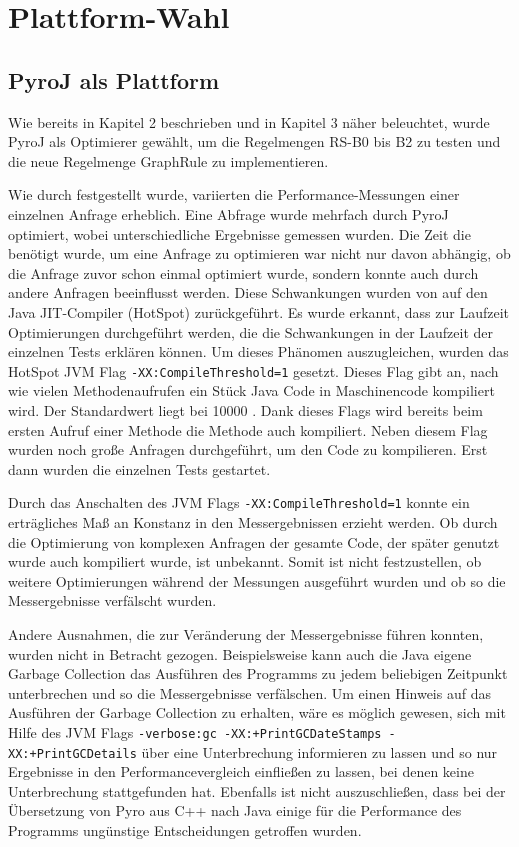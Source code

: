 \section{Plattform-Wahl}

\subsection{PyroJ als Plattform}

Wie bereits in Kapitel 2 beschrieben und in Kapitel 3 näher beleuchtet, wurde PyroJ als Optimierer gewählt, um die Regelmengen RS-B0 bis B2 zu testen und die neue Regelmenge GraphRule zu implementieren.

Wie durch \cite{shanbhag2014optimizing} festgestellt wurde, variierten die Performance-Messungen einer einzelnen Anfrage erheblich. Eine Abfrage wurde mehrfach durch PyroJ optimiert, wobei unterschiedliche Ergebnisse gemessen wurden. Die Zeit die benötigt wurde, um eine Anfrage zu optimieren war nicht nur davon abhängig, ob die Anfrage zuvor schon einmal optimiert wurde, sondern konnte auch durch andere Anfragen beeinflusst werden. Diese Schwankungen wurden von \cite{shanbhag2014optimizing} auf den Java JIT-Compiler (HotSpot) zurückgeführt. Es wurde erkannt, dass zur Laufzeit Optimierungen durchgeführt werden, die die Schwankungen in der Laufzeit der einzelnen Tests erklären können. Um dieses Phänomen auszugleichen, wurden das HotSpot JVM Flag \texttt{-XX:CompileThreshold=1} gesetzt. Dieses Flag gibt an, nach wie vielen Methodenaufrufen ein Stück Java Code in Maschinencode kompiliert wird. Der Standardwert liegt bei 10000 \cite{oracle2015VMOptions}. Dank dieses Flags wird bereits beim ersten Aufruf einer Methode die Methode auch kompiliert. Neben diesem Flag wurden noch große Anfragen durchgeführt, um den Code zu kompilieren. Erst dann wurden die einzelnen Tests gestartet.


Durch das Anschalten des JVM Flags \texttt{-XX:CompileThreshold=1} konnte ein erträgliches Maß an Konstanz in den Messergebnissen erzieht werden. Ob durch die Optimierung von komplexen Anfragen der gesamte Code, der später genutzt wurde auch kompiliert wurde, ist unbekannt. Somit ist nicht festzustellen, ob weitere Optimierungen während der Messungen ausgeführt wurden und ob so die Messergebnisse verfälscht wurden.

Andere Ausnahmen, die zur Veränderung der Messergebnisse führen konnten, wurden nicht in Betracht gezogen. Beispielsweise kann auch die Java eigene  Garbage Collection das Ausführen des Programms zu jedem beliebigen Zeitpunkt unterbrechen und so die Messergebnisse verfälschen. Um einen Hinweis auf das Ausführen der Garbage Collection zu erhalten, wäre es möglich gewesen, sich mit Hilfe des  JVM Flags \texttt{-verbose:gc -XX:+PrintGCDateStamps -XX:+PrintGCDetails} über eine Unterbrechung informieren zu lassen  \cite{andreasson2015JVM}  und so nur Ergebnisse in den Performancevergleich einfließen zu lassen, bei denen keine Unterbrechung stattgefunden hat. Ebenfalls ist nicht auszuschließen, dass bei der Übersetzung von Pyro aus C++ nach Java einige für die Performance des Programms ungünstige Entscheidungen getroffen wurden. 




